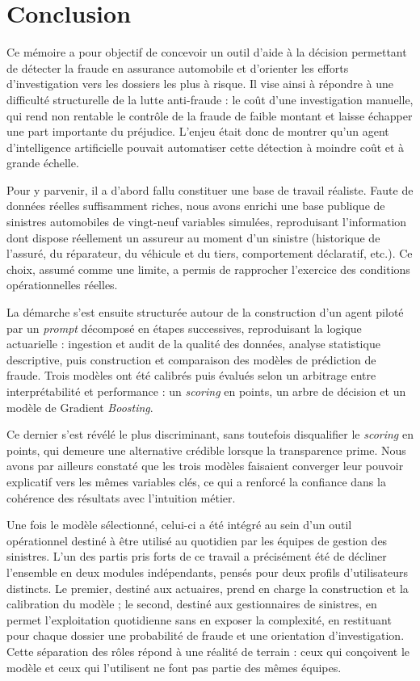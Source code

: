 \chapter*{Conclusion}
\label{chap:conclusion}
{}

Ce mémoire a pour objectif de concevoir un outil d'aide à la décision permettant de détecter la fraude en assurance automobile et d'orienter les efforts d'investigation vers les dossiers les plus à risque. Il vise ainsi à répondre à une difficulté structurelle de la lutte anti-fraude : le coût d'une investigation manuelle, qui rend non rentable le contrôle de la fraude de faible montant et laisse échapper une part importante du préjudice. L'enjeu était donc de montrer qu'un agent d'intelligence artificielle pouvait automatiser cette détection à moindre coût et à grande échelle.

Pour y parvenir, il a d'abord fallu constituer une base de travail réaliste. Faute de données réelles suffisamment riches, nous avons enrichi une base publique de sinistres automobiles de vingt-neuf variables simulées, reproduisant l'information dont dispose réellement un assureur au moment d'un sinistre (historique de l'assuré, du réparateur, du véhicule et du tiers, comportement déclaratif, etc.). Ce choix, assumé comme une limite, a permis de rapprocher l'exercice des conditions opérationnelles réelles.

La démarche s'est ensuite structurée autour de la construction d'un agent piloté par un \textit{prompt} décomposé en étapes successives, reproduisant la logique actuarielle : ingestion et audit de la qualité des données, analyse statistique descriptive, puis construction et comparaison des modèles de prédiction de fraude. Trois modèles ont été calibrés puis évalués selon un arbitrage entre interprétabilité et performance : un \textit{scoring} en points, un arbre de décision et un modèle de Gradient \textit{Boosting}.

Ce dernier s'est révélé le plus discriminant, sans toutefois disqualifier le \textit{scoring} en points, qui demeure une alternative crédible lorsque la transparence prime. Nous avons par ailleurs constaté que les trois modèles faisaient converger leur pouvoir explicatif vers les mêmes variables clés, ce qui a renforcé la confiance dans la cohérence des résultats avec l'intuition métier.

Une fois le modèle sélectionné, celui-ci a été intégré au sein d'un outil opérationnel destiné à être utilisé au quotidien par les équipes de gestion des sinistres. L'un des partis pris forts de ce travail a précisément été de décliner l'ensemble en deux modules indépendants, pensés pour deux profils d'utilisateurs distincts. Le premier, destiné aux actuaires, prend en charge la construction et la calibration du modèle ; le second, destiné aux gestionnaires de sinistres, en permet l'exploitation quotidienne sans en exposer la complexité, en restituant pour chaque dossier une probabilité de fraude et une orientation d'investigation. Cette séparation des rôles répond à une réalité de terrain : ceux qui conçoivent le modèle et ceux qui l'utilisent ne font pas partie des mêmes équipes.


